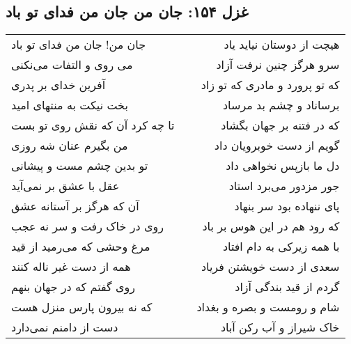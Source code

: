 \begin{center}
\section*{غزل ۱۵۴: جان من جان من فدای تو باد}
\label{sec:154}
\begin{longtable}{l p{0.5cm} r}
جان من! جان من فدای تو باد
&&
هیچت از دوستان نیاید یاد
\\
می روی و التفات می‌نکنی
&&
سرو هرگز چنین نرفت آزاد
\\
آفرین خدای بر پدری
&&
که تو پرورد و مادری که تو زاد
\\
بخت نیکت به منتهای امید
&&
برساناد و چشم بد مرساد
\\
تا چه کرد آن که نقش روی تو بست
&&
که در فتنه بر جهان بگشاد
\\
من بگیرم عنان شه روزی
&&
گویم از دست خوبرویان داد
\\
تو بدین چشم مست و پیشانی
&&
دل ما بازپس نخواهی داد
\\
عقل با عشق بر نمی‌آید
&&
جور مزدور می‌برد استاد
\\
آن که هرگز بر آستانه عشق
&&
پای ننهاده بود سر بنهاد
\\
روی در خاک رفت و سر نه عجب
&&
که رود هم در این هوس بر باد
\\
مرغ وحشی که می‌رمید از قید
&&
با همه زیرکی به دام افتاد
\\
همه از دست غیر ناله کنند
&&
سعدی از دست خویشتن فریاد
\\
روی گفتم که در جهان بنهم
&&
گردم از قید بندگی آزاد
\\
که نه بیرون پارس منزل هست
&&
شام و رومست و بصره و بغداد
\\
دست از دامنم نمی‌دارد
&&
خاک شیراز و آب رکن آباد
\\
\end{longtable}
\end{center}
